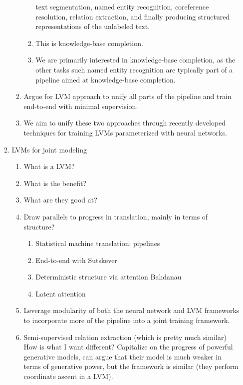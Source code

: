 \documentclass[12pt]{article}
\begin{document}
\begin{enumerate}
\begin{enumerate}
\begin{enumerate}
\begin{enumerate}
                text segmentation, named entity recognition, coreference resolution,
                relation extraction, and finally producing structured representations of the unlabeled text.
            \item This is knowledge-base completion.
            \item We are primarily interested in knowledge-base completion,
                as the other tasks such named entity recognition are typically
                part of a pipeline aimed at knowledge-base completion.
            \end{enumerate}
        \item Argue for LVM approach to unify all parts of the pipeline and train
            end-to-end with minimal supervision.
        \item We aim to unify these two approaches through recently developed techniques for training LVMs
            parameterized with neural networks.
        \end{enumerate}
    \item LVMs for joint modeling
        \begin{enumerate}
        \item What is a LVM?
        \item What is the benefit?
        \item What are they good at?
        \item Draw parallels to progress in translation, mainly in terms of structure?
            \begin{enumerate}
            \item Statistical machine translation: pipelines
            \item End-to-end with Sutskever
            \item Deterministic structure via attention Bahdanau
            \item Latent attention \citet{deng2018attn}
            \end{enumerate}
        \item Leverage modularity of both the neural network and LVM frameworks
            to incorporate more of the pipeline into a joint training framework.
        \item \citet{qu2017ssre} Semi-supervised relation extraction (which is pretty much similar)
            How is what I want different? Capitalize on the progress of powerful generative models,
            can argue that their model is much weaker in terms of generative power,
            but the framework is similar (they perform coordinate ascent in a LVM).

\end{enumerate}
\end{enumerate}
\end{enumerate}
\end{document}
